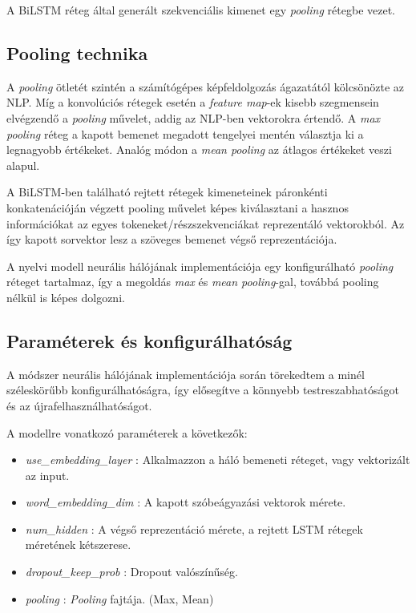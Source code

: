 A BiLSTM réteg által generált szekvenciális kimenet egy \textit{pooling} rétegbe vezet.

\subsection{Pooling technika}

A \textit{pooling} ötletét szintén a számítógépes képfeldolgozás ágazatától kölcsönözte az NLP. Míg a konvolúciós rétegek esetén a \textit{feature map}-ek kisebb szegmensein elvégzendő a \textit{pooling} művelet, addig az NLP-ben vektorokra értendő.
A \textit{max pooling} réteg a kapott bemenet megadott tengelyei mentén választja ki a legnagyobb értékeket. Analóg módon a \textit{mean pooling} az átlagos értékeket veszi alapul.

A BiLSTM-ben található rejtett rétegek kimeneteinek páronkénti konkatenációján végzett pooling művelet képes kiválasztani a hasznos információkat az egyes tokeneket/részszekvenciákat reprezentáló vektorokból. Az így kapott sorvektor lesz a szöveges bemenet végső reprezentációja.

A nyelvi modell neurális hálójának implementációja egy konfigurálható \textit{pooling} réteget tartalmaz, így a megoldás \textit{max} és \textit{mean pooling}-gal, továbbá pooling nélkül is képes dolgozni.

\subsection{Paraméterek és konfigurálhatóság}

A módszer neurális hálójának implementációja során törekedtem a minél széleskörűbb konfigurálhatóságra, így elősegítve a könnyebb testreszabhatóságot és az újrafelhasználhatóságot. 

A modellre vonatkozó paraméterek a következők:
\begin{itemize}
	\item \textit{use\_embedding\_layer} : Alkalmazzon a háló bemeneti réteget, vagy vektorizált az input.
	\item \textit{word\_embedding\_dim} : A kapott szóbeágyazási vektorok mérete.
	\item \textit{num\_hidden} : A végső reprezentáció mérete, a rejtett LSTM rétegek méretének kétszerese.
	\item \textit{dropout\_keep\_prob} : Dropout valószínűség.
	\item \textit{pooling} : \textit{Pooling} fajtája. (Max, Mean)	
\end{itemize}

